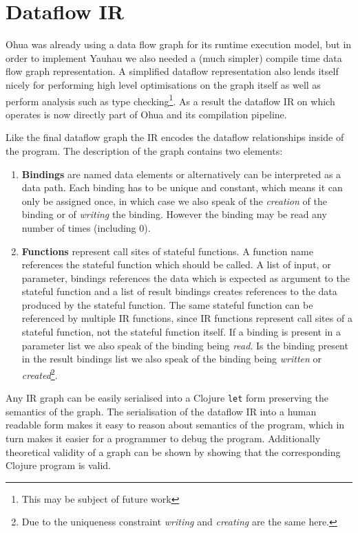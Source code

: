 \section{Dataflow IR}

Ohua was already using a data flow graph for its runtime execution model, but in order to implement Yauhau we also needed a (much simpler) compile time data flow graph representation.
A simplified dataflow representation also lends itself nicely for performing high level optimisations on the graph itself as well as perform analysis such as type checking\footnote{This may be subject of future work}.
As a result the dataflow IR on which \yauhau{} operates is now directly part of Ohua and its compilation pipeline.

Like the final dataflow graph the IR encodes the dataflow relationships inside of the program.
The description of the graph contains two elements:

\begin{enumerate}
    \item \textbf{Bindings} are named data elements or alternatively can be interpreted as a data path.
    Each binding has to be unique and constant, which means it can only be assigned once, in which case we also speak of the \textit{creation} of the binding or of \textit{writing} the binding.
    However the binding may be read any number of times (including 0).
    \item \textbf{Functions} represent call sites of stateful functions.
    A function name references the stateful function which should be called.
    A list of input, or parameter, bindings references the data which is expected as argument to the stateful function and a list of result bindings creates references to the data produced by the stateful function.
    The same stateful function can be referenced by multiple IR functions, since IR functions represent call sites of a stateful function, not the stateful function itself.
    If a binding is present in a parameter list we also speak of the binding being \textit{read}.
    Is the binding present in the result bindings list we also speak of the binding being \textit{written} or \textit{created}\footnote{Due to the uniqueness constraint \textit{writing} and \textit{creating} are the same here.}.
\end{enumerate}

Any IR graph can be easily serialised into a Clojure \texttt{let} form preserving the semantics of the graph.
The serialisation of the dataflow IR into a human readable form makes it easy to reason about semantics of the program, which in turn makes it easier for a programmer to debug the program.
Additionally theoretical validity of a graph can be shown by showing that the corresponding Clojure program is valid.

